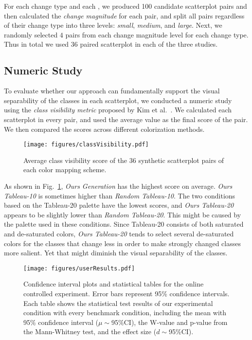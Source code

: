 For each change type and each , we produced 100 candidate scatterplot pairs and then calculated the \emph{change magnitude} for each pair, and split all  pairs regardless of their change type into three levels: \emph{small},  \emph{medium}, and \emph{large}.
Next, we randomly selected $4$ pairs from each change magnitude level for each change type. Thus in total we used $36$ paired scatterplot in each of the three studies.

\subsection{Numeric Study}
\label{subsec:quantitystudy}
To evaluate whether our approach can fundamentally support the visual separability of the classes in each scatterplot, we conducted a numeric study using the \emph{class visibility metric} proposed by Kim et al.~\cite{lee2013perceptually}. We calculated each scatterplot in every pair, and used the average value as the final score of the pair. We then compared the scores across different colorization methods.


\begin{figure}[h]
\centering
\texttt{[image: figures/classVisibility.pdf]}
\caption{Average class visibility score of the 36 synthetic scatterplot pairs of each color mapping scheme.}
\vspace*{-3mm}
\label{fig:classVisibility}
\end{figure}

As shown in Fig.~\ref{fig:classVisibility}, \emph{Ours Generation} has the highest score on average. \emph{Ours Tableau-10} is sometimes higher than \emph{Random Tableau-10}. The two conditions based on the Tableau-20 palette have the lowest scores, and \emph{Ours Tableau-20} appears to be slightly lower than \emph{Random Tableau-20}. This might be caused by the palette used in these conditions. Since Tableau-20 consists of both saturated and de-saturated colors, \emph{Ours Tableau-20} tends to select several de-saturated colors for the classes that change less in order to make strongly changed classes more salient. Yet that might diminish the visual separability of the classes.

\begin{figure*}[t]
\centering
\texttt{[image: figures/userResults.pdf]}
\caption{Confidence interval plots and statistical tables for the online controlled experiment. Error bars represent 95\% confidence intervals. Each table shows the statistical test results of our experimental condition with every benchmark condition, including the mean with 95\% confidence interval ($\mu\sim$95\%CI), the W-value and p-value from the Mann-Whitney test, and the effect size ($d\sim$95\%CI).
}
\vspace*{-3mm}
\label{fig:userResults}
\end{figure*}

